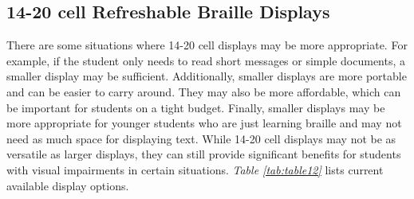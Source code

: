 \pagebreak
\hypertarget{few-cell-refreshable-braille-displays}{}\subsection{14-20 cell Refreshable Braille
 Displays}\label{few-cell-refreshable-braille-displays}
There are some situations where 14-20 cell displays may be more appropriate. For example, if the student only needs to read short messages or simple documents, a smaller display may be sufficient. Additionally, smaller displays are more portable and can be easier to carry around. They may also be more affordable, which can be important for students on a tight budget. Finally, smaller displays may be more appropriate for younger students who are just learning braille and may not need as much space for displaying text. While 14-20 cell displays may not be as versatile as larger displays, they can still provide significant benefits for students with visual impairments in certain situations. \textit{Table \ref{tab:table12}} lists current available display options.

